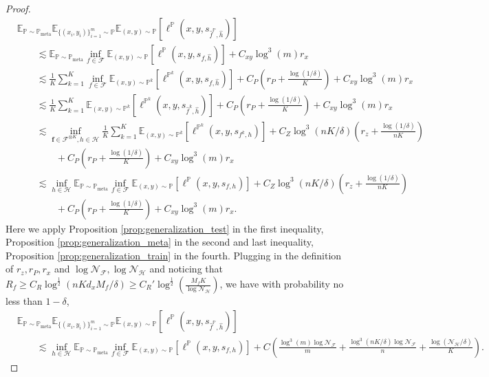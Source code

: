 \documentclass{article}
\numberwithin{equation}{section}
\def\vf{{\bm{f}}}
\newcommand{\E}{\mathbb{E}}
\theoremstyle{definition}
\newcommand{\Pmeta}{\mathbb{P}_{\text{meta}}}
\renewcommand{\P}{\mathbb{P}}
\begin{document}
\begin{proof}
    \begin{equation}
        \begin{aligned}
            &\E_{\P\sim\Pmeta}\E_{\{(x_i,y_i)\}_{i=1}^m\sim \P} \E_{(x,y)\sim\P} [\ell^\P(x,y,s_{\widehat{f}^\P,\widehat{h}})] \\
            &\qquad \lesssim \E_{\P\sim\Pmeta} \inf_{f\in\mathcal{F}} \E_{(x,y)\sim\P} [\ell^\P(x,y,s_{f,\widehat{h}})]+C_{xy}\log^3(m)r_x \\
            &\qquad \lesssim \frac{1}{K}\sum_{k=1}^K\inf_{f\in\mathcal{F}} \E_{(x,y)\sim\P^k} [\ell^{\P^k}(x,y,s_{f,\widehat{h}})]+C_P\left(r_P+\frac{\log(1/\delta)}{K}\right)+C_{xy}\log^3(m)r_x \\
            &\qquad \lesssim \frac{1}{K}\sum_{k=1}^K \E_{(x,y)\sim\P^k} [\ell^{\P^k}(x,y,s_{\widehat{f}^k,\widehat{h}})]+C_P\left(r_P+\frac{\log(1/\delta)}{K}\right)+C_{xy}\log^3(m)r_x \\
            &\qquad \lesssim \inf_{\vf\in\mathcal{F}^{\otimes K},h\in\mathcal{H}} \frac{1}{K}\sum_{k=1}^K \E_{(x,y)\sim\P^k} [\ell^{\P^k}(x,y,s_{f^k,h})]+C_Z\log^3(nK/\delta)\left(r_z+\frac{\log(1/\delta)}{nK}\right) \\
            &\qquad\qquad +C_P\left(r_P+\frac{\log(1/\delta)}{K}\right)+C_{xy}\log^3(m)r_x \\
            &\qquad \lesssim \inf_{h\in\mathcal{H}} \E_{\P\sim\Pmeta} \inf_{f\in\mathcal{F}}\E_{(x,y)\sim\P} [\ell^\P (x,y,s_{f,h})]+C_Z\log^3(nK/\delta)\left(r_z+\frac{\log(1/\delta)}{nK}\right) \\
            &\qquad\qquad +C_P\left(r_P+\frac{\log(1/\delta)}{K}\right)+C_{xy}\log^3(m)r_x.
        \end{aligned}
    \end{equation}
    Here we apply Proposition \ref{prop:generalization_test} in the first inequality, Proposition \ref{prop:generalization_meta} in the second and last inequality, Proposition \ref{prop:generalization_train} in the fourth. 
    Plugging in the definition of $r_z,r_P,r_x$ and $\log\mathcal{N}_\mathcal{F},\log\mathcal{N}_\mathcal{H}$ and
    noticing that $R_f\geq C_R\log^{\frac{1}{2}}(nKd_xM_f/\delta)\geq C_R'\log^{\frac{1}{2}}\left(\frac{M_fK}{\log\mathcal{N}_\mathcal{H}}\right)$, we have with probability no less than $1-\delta$,
    \begin{equation}
        \begin{aligned}
            &\E_{\P\sim\Pmeta}\E_{\{(x_i,y_i)\}_{i=1}^m\sim \P} \E_{(x,y)\sim\P} [\ell^\P(x,y,s_{\widehat{f}^\P,\widehat{h}})] \\
            &\qquad \lesssim \inf_{h\in\mathcal{H}} \E_{\P\sim\Pmeta} \inf_{f\in\mathcal{F}}\E_{(x,y)\sim\P} [\ell^\P (x,y,s_{f,h})] + C \left(\frac{\log^3(m)\log\mathcal{N}_\mathcal{F}}{m} + \frac{\log^3(nK/\delta)\log\mathcal{N}_\mathcal{F}}{n}+\frac{\log(\mathcal{N}_\mathcal{H}/\delta)}{K}\right).
        \end{aligned}
    \end{equation}
\end{proof}
\end{document}
